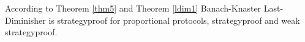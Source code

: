 \begin{bezeichnungen}
According to Theorem \ref{thm5} and Theorem \ref{ldim1} Banach-Knaster Last-Diminisher is strategyproof for proportional protocols, strategyproof and weak strategyproof.
\end{bezeichnungen}

\newpage
